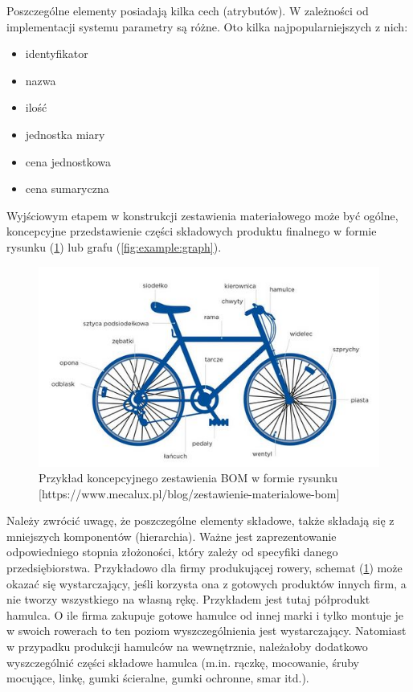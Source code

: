 \documentclass[12pt,twoside]{article}
\begin{document}
Poszczególne elementy posiadają kilka cech (atrybutów). W zależności od implementacji systemu parametry są różne. Oto kilka najpopularniejszych z nich:

\begin{itemize}[label=-,labelsep=0.4cm,leftmargin=0.6cm]
\item identyfikator
\item nazwa
\item ilość
\item jednostka miary
\item cena jednostkowa
\item cena sumaryczna
\end{itemize}

Wyjściowym etapem w konstrukcji zestawienia materiałowego może być ogólne, koncepcyjne przedstawienie części składowych produktu finalnego w formie rysunku (\ref{fig:example:drawing}) lub grafu (\ref{fig:example:graph}).

\begin{figure}[ht]
	\centering
	\includegraphics[width=\textwidth]{figures/examples/drawing.jpg}
	\caption{Przykład koncepcyjnego zestawienia BOM w formie rysunku [https://www.mecalux.pl/blog/zestawienie-materialowe-bom]}
\label{fig:example:drawing}
\end{figure}

Należy zwrócić uwagę, że poszczególne elementy składowe, także składają się z mniejszych komponentów (hierarchia). Ważne jest zaprezentowanie odpowiedniego stopnia złożoności, który zależy od specyfiki danego przedsiębiorstwa. Przykładowo dla firmy produkującej rowery, schemat (\ref{fig:example:drawing}) może okazać się wystarczający, jeśli korzysta ona z gotowych produktów innych firm, a nie tworzy wszystkiego na własną rękę. Przykładem jest tutaj półprodukt hamulca. O ile firma zakupuje gotowe hamulce od innej marki i tylko montuje je w swoich rowerach to ten poziom wyszczególnienia jest wystarczający. Natomiast w przypadku produkcji hamulców na wewnętrznie, należałoby dodatkowo wyszczególnić części składowe hamulca (m.in. rączkę, mocowanie, śruby mocujące, linkę, gumki ścieralne, gumki ochronne, smar itd.).
\end{document}
